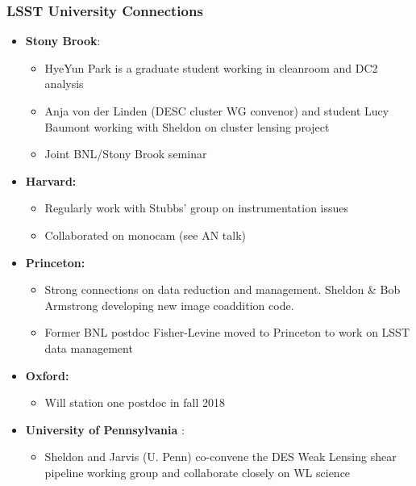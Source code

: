 \documentclass[aspectratio=169]{beamer}
\begin{document}
\begin{frame}
  \frametitle{LSST University Connections}

  \begin{itemize}


    \item \textbf{Stony Brook}:
        \begin{itemize}
            \item HyeYun Park is a graduate student working in cleanroom and
                DC2 analysis
            \item Anja von der Linden (DESC cluster WG convenor) and student Lucy Baumont working with Sheldon on cluster lensing project
            \item Joint BNL/Stony Brook seminar
        \end{itemize}


    \item \textbf{Harvard:}
        \begin{itemize}
            \item Regularly work with Stubbs' group on instrumentation
                issues
            \item Collaborated on monocam (see AN talk)
        \end{itemize}

    \item \textbf{Princeton:}
        \begin{itemize}
            \item Strong connections on data reduction and management.  Sheldon
                \& Bob Armstrong developing new image coaddition code.
            \item Former BNL postdoc Fisher-Levine moved to Princeton to
                work on LSST data management
        \end{itemize}
    \item \textbf{Oxford:}
        \begin{itemize}
            \item Will station one postdoc in fall 2018
        \end{itemize}

    \item \textbf{University of Pennsylvania }:
        \begin{itemize}
            \item Sheldon and Jarvis (U. Penn) co-convene the DES Weak Lensing 
                shear pipeline working group and collaborate closely on WL science
        \end{itemize}


\end{itemize}
\end{frame}
\end{document}
